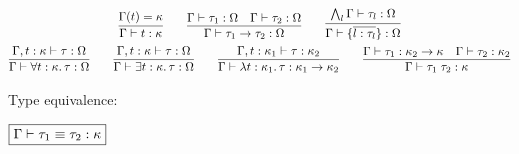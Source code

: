 \begin{gather*}
  \infer{\Gamma \vdash t: \kappa}{
    \Gamma(t) = \kappa
  }
  \hspace{2em}
  \infer{\Gamma \vdash \tau_1 \to \tau_2: \Omega}{
    \Gamma \vdash \tau_1: \Omega
    &
    \Gamma \vdash \tau_2: \Omega
  }
  \hspace{2em}
  \infer{\Gamma \vdash \{\overline{l: \tau_l}\}: \Omega}{
    \bigwedge_l \Gamma \vdash \tau_l: \Omega
  }
  \\
  \infer{\Gamma \vdash \forall t: \kappa\ldotp \tau: \Omega}{
    \Gamma, t: \kappa \vdash \tau: \Omega
  }
  \hspace{2em}
  \infer{\Gamma \vdash \exists t: \kappa\ldotp \tau: \Omega}{
    \Gamma, t: \kappa \vdash \tau: \Omega
  }
  \hspace{2em}
  \infer{\Gamma \vdash \lambda t: \kappa_1\ldotp \tau: \kappa_1 \to \kappa_2}{
    \Gamma, t: \kappa_1 \vdash \tau: \kappa_2
  }
  \hspace{2em}
  \infer{\Gamma \vdash \tau_1\; \tau_2: \kappa}{
    \Gamma \vdash \tau_1: \kappa_2 \to \kappa
    &
    \Gamma \vdash \tau_2: \kappa_2
  }
\end{gather*}

Type equivalence:

$\fbox{$\Gamma \vdash \tau_1 \equiv \tau_2: \kappa$}$

